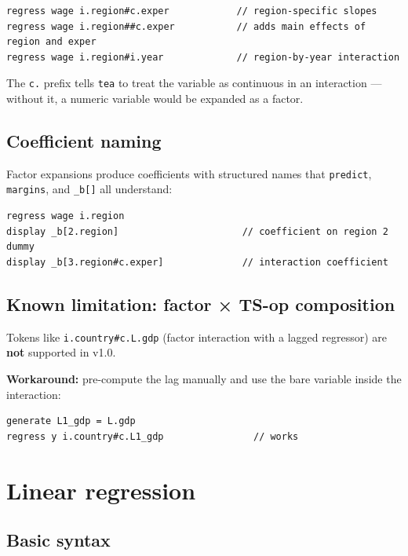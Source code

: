 \documentclass[11pt,letterpaper]{article}
\newcommand{\teaversion}{1.0}
\begin{document}
\begin{lstlisting}
regress wage i.region#c.exper            // region-specific slopes
regress wage i.region##c.exper           // adds main effects of region and exper
regress wage i.region#i.year             // region-by-year interaction
\end{lstlisting}

The \texttt{c.} prefix tells \texttt{tea} to treat the variable as
continuous in an interaction — without it, a numeric variable would be
expanded as a factor.

\subsection{Coefficient naming}

Factor expansions produce coefficients with structured names that
\texttt{predict}, \texttt{margins}, and \texttt{\_b[]} all understand:

\begin{lstlisting}
regress wage i.region
display _b[2.region]                      // coefficient on region 2 dummy
display _b[3.region#c.exper]              // interaction coefficient
\end{lstlisting}

\subsection{Known limitation: factor × TS-op composition}

Tokens like \texttt{i.country\#c.L.gdp} (factor interaction with a
lagged regressor) are \textbf{not} supported in v\teaversion.

\textbf{Workaround:} pre-compute the lag manually and use the bare
variable inside the interaction:

\begin{lstlisting}
generate L1_gdp = L.gdp
regress y i.country#c.L1_gdp                // works
\end{lstlisting}

\section{Linear regression}

\subsection{Basic syntax}
\end{document}
